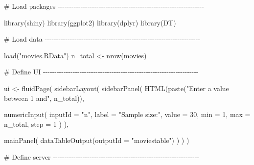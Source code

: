 \documentclass[
  letterpaper,
  DIV=11,
  numbers=noendperiod]{scrreprt}
\newenvironment{Shaded}{\begin{snugshade}}{\end{snugshade}}
\newcommand{\AttributeTok}[1]{\textcolor[rgb]{0.40,0.46,0.14}{#1}}
\newcommand{\CommentTok}[1]{\textcolor[rgb]{0.37,0.37,0.37}{#1}}
\newcommand{\DecValTok}[1]{\textcolor[rgb]{0.68,0.00,0.00}{#1}}
\newcommand{\FunctionTok}[1]{\textcolor[rgb]{0.28,0.35,0.67}{#1}}
\newcommand{\NormalTok}[1]{\textcolor[rgb]{0.00,0.46,0.62}{#1}}
\newcommand{\OtherTok}[1]{\textcolor[rgb]{0.00,0.46,0.62}{#1}}
\newcommand{\StringTok}[1]{\textcolor[rgb]{0.13,0.47,0.30}{#1}}
\begin{document}
\begin{Shaded}
\begin{Highlighting}[]
\CommentTok{\# Load packages {-}{-}{-}{-}{-}{-}{-}{-}{-}{-}{-}{-}{-}{-}{-}{-}{-}{-}{-}{-}{-}{-}{-}{-}{-}{-}{-}{-}{-}{-}{-}{-}{-}{-}{-}{-}{-}{-}{-}{-}{-}{-}{-}{-}{-}{-}{-}{-}{-}{-}{-}{-}{-}{-}{-}{-}{-}{-}{-}{-}{-}{-}{-}{-}}

\FunctionTok{library}\NormalTok{(shiny)}
\FunctionTok{library}\NormalTok{(ggplot2)}
\FunctionTok{library}\NormalTok{(dplyr)}
\FunctionTok{library}\NormalTok{(DT)}

\CommentTok{\# Load data {-}{-}{-}{-}{-}{-}{-}{-}{-}{-}{-}{-}{-}{-}{-}{-}{-}{-}{-}{-}{-}{-}{-}{-}{-}{-}{-}{-}{-}{-}{-}{-}{-}{-}{-}{-}{-}{-}{-}{-}{-}{-}{-}{-}{-}{-}{-}{-}{-}{-}{-}{-}{-}{-}{-}{-}{-}{-}{-}{-}{-}{-}{-}{-}{-}{-}{-}{-}}

\FunctionTok{load}\NormalTok{(}\StringTok{"movies.RData"}\NormalTok{)}
\NormalTok{n\_total }\OtherTok{\textless{}{-}} \FunctionTok{nrow}\NormalTok{(movies)}

\CommentTok{\# Define UI {-}{-}{-}{-}{-}{-}{-}{-}{-}{-}{-}{-}{-}{-}{-}{-}{-}{-}{-}{-}{-}{-}{-}{-}{-}{-}{-}{-}{-}{-}{-}{-}{-}{-}{-}{-}{-}{-}{-}{-}{-}{-}{-}{-}{-}{-}{-}{-}{-}{-}{-}{-}{-}{-}{-}{-}{-}{-}{-}{-}{-}{-}{-}{-}{-}{-}{-}{-}}

\NormalTok{ui }\OtherTok{\textless{}{-}} \FunctionTok{fluidPage}\NormalTok{(}
  \FunctionTok{sidebarLayout}\NormalTok{(}
    \FunctionTok{sidebarPanel}\NormalTok{(}
      \FunctionTok{HTML}\NormalTok{(}\FunctionTok{paste}\NormalTok{(}\StringTok{"Enter a value between 1 and"}\NormalTok{, n\_total)),}

      \FunctionTok{numericInput}\NormalTok{(}
        \AttributeTok{inputId =} \StringTok{"n"}\NormalTok{,}
        \AttributeTok{label =} \StringTok{"Sample size:"}\NormalTok{,}
        \AttributeTok{value =} \DecValTok{30}\NormalTok{,}
        \AttributeTok{min =} \DecValTok{1}\NormalTok{, }\AttributeTok{max =}\NormalTok{ n\_total,}
        \AttributeTok{step =} \DecValTok{1}
\NormalTok{      )}
\NormalTok{    ),}

    \FunctionTok{mainPanel}\NormalTok{(}
      \FunctionTok{dataTableOutput}\NormalTok{(}\AttributeTok{outputId =} \StringTok{"moviestable"}\NormalTok{)}
\NormalTok{    )}
\NormalTok{  )}
\NormalTok{)}

\CommentTok{\# Define server {-}{-}{-}{-}{-}{-}{-}{-}{-}{-}{-}{-}{-}{-}{-}{-}{-}{-}{-}{-}{-}{-}{-}{-}{-}{-}{-}{-}{-}{-}{-}{-}{-}{-}{-}{-}{-}{-}{-}{-}{-}{-}{-}{-}{-}{-}{-}{-}{-}{-}{-}{-}{-}{-}{-}{-}{-}{-}{-}{-}{-}{-}{-}{-}}


\end{Highlighting}
\end{Shaded}
\end{document}
